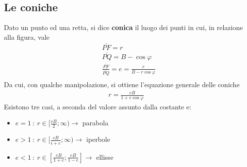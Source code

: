 \subsection{Le coniche}\label{app:coniche}
Dato un punto ed una retta, si dice \textbf{conica} il luogo dei punti in cui, in relazione alla figura, vale
\begin{align*}
&\bar{PF} = r\\
&\bar{PQ} = B - \cos\varphi\\
&\frac{\bar{PF}}{\bar{PQ}} = e = \frac{r}{B - r \cos\varphi}\\
\end{align*}
Da cui, con qualche manipolazione, si ottiene l'equazione generale delle coniche
\begin{align*}
	r = \frac{eB}{1+e\cos\varphi}
\end{align*}
Esistono tre casi, a seconda del valore assunto dalla costante e:
\begin{itemize}
	\item $e = 1\ :\  r \in [ \frac{e B}{2}; \infty ) \rightarrow$ parabola
	\item $e > 1\ :\ r \in [ \frac{e B}{i+e}; \infty ) \rightarrow$ iperbole
	\item $e < 1 \ : \ r \in [ \frac{e B}{1 + e}; \frac{e B}{1 - e} ] \rightarrow$ ellisse
\end{itemize}








